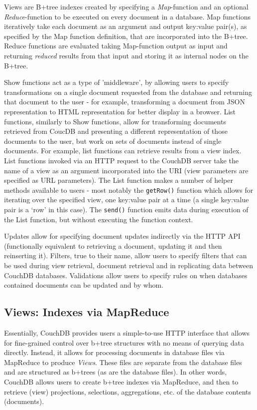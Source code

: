 Views are B+tree indexes created by specifying a \textit{Map}-function and an optional \textit{Reduce}-function to be executed on every document in a database. Map functions iteratively take each document as an argument and output key:value pair(s), as specified by the Map function definition, that are incorporated into the B+tree. Reduce functions are evaluated taking Map-function output as input and returning \textit{reduced} results from that input and storing it as internal nodes on the B+tree.

Show functions act as a type of 'middleware', by allowing users to specify transformations on a single document requested from the database and returning that document to the user - for example, transforming a document from JSON representation to HTML representation for better display in a browser. List functions, similarly to Show functions, allow for transforming documents retrieved from CoucDB and presenting a different representation of those documents to the user, but work on sets of documents instead of single documents. For example, list functions can retrieve results from a view index. List functions invoked via an HTTP request to the CouchDB server take the name of a view as an argument incorporated into the URI (view parameters are specified as URL parameters). The List function makes a number of helper methods available to users - most notably the \texttt{getRow()} function which allows for iterating over the specified view, one key:value pair at a time (a single key:value pair is a `row' in this case). The \texttt{send()} function emits data during execution of the List function, but without executing the function context.

Updates allow for specifying document updates indirectly via the HTTP API (functionally equivalent to retrieving a document, updating it and then reinserting it). Filters, true to their name, allow users to specify filters that can be used during view retrieval, document retrieval and in replicating data between CouchDB databases. Validations allow users to specify rules on when databases contained documents can be updated and by whom.

\subsection{Views: Indexes via MapReduce}
Essentially, CouchDB provides users a simple-to-use HTTP interface that allows for fine-grained control over b+tree structures with no means of querying data directly. Instead, it allows for processing documents in database files via MapReduce to produce \textit{Views}. These files are separate from the database files and are structured as b+trees (as are the database files). In other words, CouchDB allows users to create b+tree indexes via MapReduce, and then to retrieve (view) projections, selections, aggregations, etc. of the database contents (documents).

